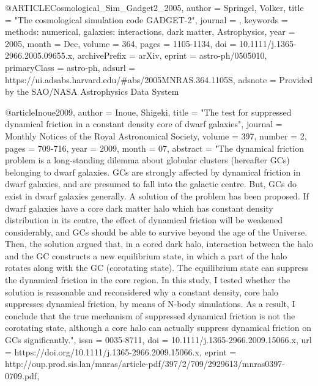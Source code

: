 \documentclass[apj]{emulateapj}
\begin{document}
{{{{{{{{{{{{{{{@ARTICLE{Cosmological_Sim_Gadget2_2005,
       author = {{Springel}, Volker},
        title = "{The cosmological simulation code GADGET-2}",
      journal = {\mnras},
     keywords = {methods: numerical, galaxies: interactions, dark matter, Astrophysics},
         year = 2005,
        month = Dec,
       volume = {364},
        pages = {1105-1134},
          doi = {10.1111/j.1365-2966.2005.09655.x},
archivePrefix = {arXiv},
       eprint = {astro-ph/0505010},
 primaryClass = {astro-ph},
       adsurl = {https://ui.adsabs.harvard.edu/\#abs/2005MNRAS.364.1105S},
      adsnote = {Provided by the SAO/NASA Astrophysics Data System}
}



@article{Inoue2009,
    author = {Inoue, Shigeki},
    title = "{The test for suppressed dynamical friction in a constant density core of dwarf galaxies}",
    journal = {Monthly Notices of the Royal Astronomical Society},
    volume = {397},
    number = {2},
    pages = {709-716},
    year = {2009},
    month = {07},
    abstract = "{The dynamical friction problem is a long-standing dilemma about globular clusters (hereafter GCs) belonging to dwarf galaxies. GCs are strongly affected by dynamical friction in dwarf galaxies, and are presumed to fall into the galactic centre. But, GCs do exist in dwarf galaxies generally. A solution of the problem has been proposed. If dwarf galaxies have a core dark matter halo which has constant density distribution in its centre, the effect of dynamical friction will be weakened considerably, and GCs should be able to survive beyond the age of the Universe. Then, the solution argued that, in a cored dark halo, interaction between the halo and the GC constructs a new equilibrium state, in which a part of the halo rotates along with the GC (corotating state). The equilibrium state can suppress the dynamical friction in the core region. In this study, I tested whether the solution is reasonable and reconsidered why a constant density, core halo suppresses dynamical friction, by means of N-body simulations. As a result, I conclude that the true mechanism of suppressed dynamical friction is not the corotating state, although a core halo can actually suppress dynamical friction on GCs significantly.}",
    issn = {0035-8711},
    doi = {10.1111/j.1365-2966.2009.15066.x},
    url = {https://doi.org/10.1111/j.1365-2966.2009.15066.x},
    eprint = {http://oup.prod.sis.lan/mnras/article-pdf/397/2/709/2929613/mnras0397-0709.pdf},
}



}}}}}}}}}}}}}}}
\end{document}
